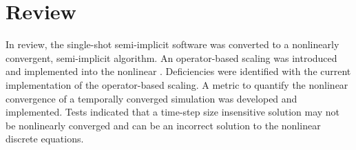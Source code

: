 \section{Review}
\label{sect:review}

In review, the single-shot semi-implicit \cobra{} software was converted to a nonlinearly convergent, semi-implicit algorithm.
An operator-based scaling was introduced and implemented into the nonlinear \cobra{}.
Deficiencies were identified with the current implementation of the operator-based scaling.
A metric to quantify the nonlinear convergence of a temporally converged simulation was developed and implemented.
Tests indicated that a time-step size insensitive solution may not be nonlinearly converged and can be an incorrect solution to the nonlinear discrete equations.